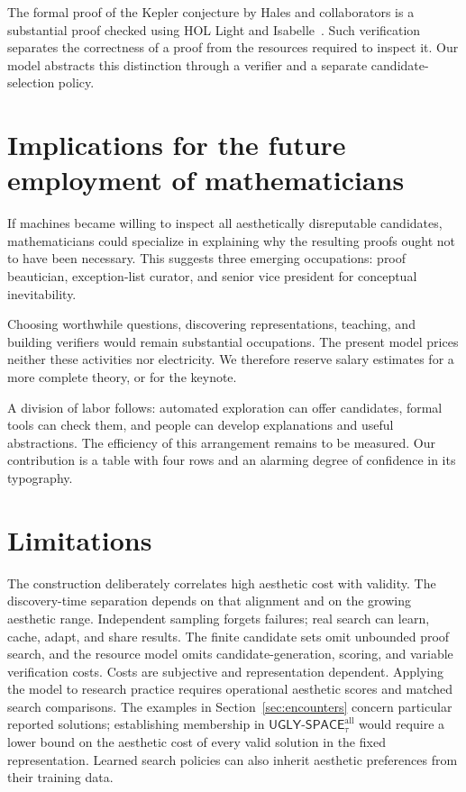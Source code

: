 \documentclass[11pt]{article}
\theoremstyle{remark}
\newcommand{\ugly}{\mathsf{UGLY\text{-}SPACE}}
\begin{document}
The formal proof of the Kepler conjecture by Hales and collaborators is a
substantial proof checked using HOL Light and Isabelle~\cite{hales2017}.
Such verification separates the correctness of a proof from the resources
required to inspect it. Our model abstracts this distinction through a
verifier and a separate candidate-selection policy.

\section{Implications for the future employment of mathematicians}
\label{sec:jobs}

If machines became willing to inspect all aesthetically disreputable
candidates, mathematicians could specialize in explaining why the resulting
proofs ought not to have been necessary. This suggests three emerging
occupations: proof beautician, exception-list curator, and senior vice
president for conceptual inevitability.

Choosing worthwhile questions, discovering representations, teaching, and
building verifiers would remain substantial occupations. The present model
prices neither these activities nor electricity. We therefore reserve
salary estimates for a more complete theory, or for the keynote.

A division of labor follows: automated exploration can
offer candidates, formal tools can check them, and people can develop
explanations and useful abstractions. The efficiency of this arrangement
remains to be measured. Our contribution is a table with four
rows and an alarming degree of confidence in its typography.

\section{Limitations}

The construction deliberately correlates high aesthetic cost with validity.
The discovery-time separation depends on that alignment and on the growing
aesthetic range. Independent sampling forgets failures; real search can
learn, cache, adapt, and share results.
The finite candidate sets omit unbounded proof search, and the resource
model omits candidate-generation, scoring, and variable verification costs.
Costs are subjective and representation dependent. Applying the model to
research practice requires operational aesthetic scores and matched search
comparisons. The examples in Section~\ref{sec:encounters} concern particular
reported solutions; establishing membership in
$\ugly^{\mathrm{all}}_\tau$ would require a lower bound on the aesthetic cost
of every valid solution in the fixed representation. Learned search policies
can also inherit aesthetic preferences from their training data.
\end{document}
